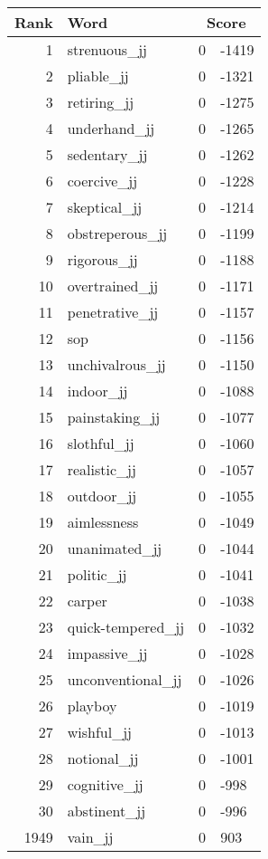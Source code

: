 \begin{longtable}[!htbp]{| rlr@{.}l |}
    \hline
    \textbf{Rank} & \textbf{Word} & \multicolumn{2}{c|}{\textbf{Score}} \\
    \hline
    \endhead
    1 & strenuous\_jj & 0 & -1419 \\
    2 & pliable\_jj & 0 & -1321 \\
    3 & retiring\_jj & 0 & -1275 \\
    4 & underhand\_jj & 0 & -1265 \\
    5 & sedentary\_jj & 0 & -1262 \\
    6 & coercive\_jj & 0 & -1228 \\
    7 & skeptical\_jj & 0 & -1214 \\
    8 & obstreperous\_jj & 0 & -1199 \\
    9 & rigorous\_jj & 0 & -1188 \\
    10 & overtrained\_jj & 0 & -1171 \\
    11 & penetrative\_jj & 0 & -1157 \\
    12 & sop & 0 & -1156 \\
    13 & unchivalrous\_jj & 0 & -1150 \\
    14 & indoor\_jj & 0 & -1088 \\
    15 & painstaking\_jj & 0 & -1077 \\
    16 & slothful\_jj & 0 & -1060 \\
    17 & realistic\_jj & 0 & -1057 \\
    18 & outdoor\_jj & 0 & -1055 \\
    19 & aimlessness & 0 & -1049 \\
    20 & unanimated\_jj & 0 & -1044 \\
    21 & politic\_jj & 0 & -1041 \\
    22 & carper & 0 & -1038 \\
    23 & quick-tempered\_jj & 0 & -1032 \\
    24 & impassive\_jj & 0 & -1028 \\
    25 & unconventional\_jj & 0 & -1026 \\
    26 & playboy & 0 & -1019 \\
    27 & wishful\_jj & 0 & -1013 \\
    28 & notional\_jj & 0 & -1001 \\
    29 & cognitive\_jj & 0 & -998 \\
    30 & abstinent\_jj & 0 & -996 \\
    1949 & vain\_jj & 0 & 903 \\

\end{longtable}
